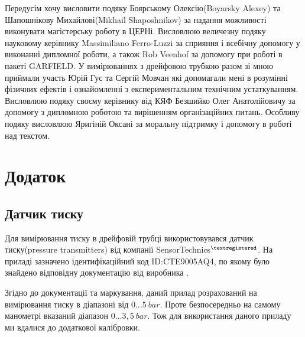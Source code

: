 \documentclass[pdftex,14pt]{scrartcl}
\begin{document}
	Передусім хочу висловити подяку Боярському Олексію(Boyarsky Alexey) та Шапошнікову Михайлові(Mikhail Shaposhnikov) за надання можливості виконувати магістерську роботу в ЦЕРНі.
	Висловлюю величезну подяку науковому керівнику Massimiliano  Ferro-Luzzi за сприяння і всебічну допомогу у виконанні дипломної роботи, а також Rob Veenhof за допомогу при роботі в пакеті GARFIELD. У вимірюваннях з дрейфовою трубкою разом зі мною приймали участь Юрій Гус та Сергій Мовчан які допомагали мені в розумінні фізичних ефектів і ознайомленні з експериментальним технічним устаткуванням. Висловлюю подяку своєму керівнику від КЯФ Безшийко Олег Анатолійовичу за допомогу з дипломною роботою та вирішенням організаційних питань.
	Особливу подяку висловлюю Яригіній Оксані за моральну підтримку і допомогу в роботі над текстом.
		
\newpage
\section{Додаток}

\subsection{Датчик тиску}

	
	
	
	Для вимірювання тиску в дрейфовій трубці використовувався датчик тиску(pressure transmitters) від компанії SensorTechnics$^{\textregistered}$. На приладі зазначено ідентифікаційний код ID:CTE9005AQ4, по якому було знайдено відповідну документацію від виробника \cite{presTransmitDatasheet}.

	Згідно до документації та маркування, даний прилад розрахований на вимірювання тиску в діапазоні від $0 \dots 5~bar$. Проте безпосередньо на самому манометрі вказаний діапазон $0\dots 3,5~bar$. Тож для використання даного приладу ми вдалися до додаткової калібровки.
	
\end{document}

